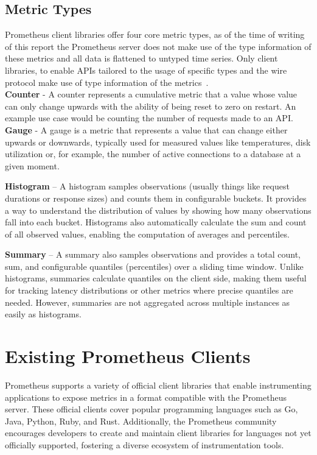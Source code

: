 \subsection{Metric Types}\label{subsec:metric-types}

Prometheus client libraries offer four core metric types, as of the time of writing of this report the Prometheus
server does not make use of the type information of these metrics and all data is flattened to untyped time series.
Only client libraries, to enable \ac{API}s tailored to the usage of specific types and the wire protocol make use of
type information of the metrics~\cite{prometheus_metric_types}.\\

\textbf{Counter} - A counter represents a cumulative metric that a value whose value can only change upwards with
the ability of being reset to zero on restart.
An example use case would be counting the number of requests made to an \ac{API}.\\

\textbf{Gauge} - A gauge is a metric that represents a value that can change either upwards or downwards, typically
used for measured values like temperatures, disk utilization or, for example, the number of active connections
to a database at a given moment.

\textbf{Histogram} – A histogram samples observations (usually things like request durations or response sizes) and counts them in configurable buckets.
It provides a way to understand the distribution of values by showing how many observations fall into each bucket.
Histograms also automatically calculate the sum and count of all observed values, enabling the computation of averages and percentiles.

\textbf{Summary} – A summary also samples observations and provides a total count, sum, and configurable quantiles (percentiles) over a sliding time window.
Unlike histograms, summaries calculate quantiles on the client side, making them useful for tracking latency distributions or other metrics where precise quantiles are needed.
However, summaries are not aggregated across multiple instances as easily as histograms.


\section{Existing Prometheus Clients}\label{sec:existing-prometheus-clients}

Prometheus supports a variety of official client libraries that enable instrumenting applications to expose
metrics in a format compatible with the Prometheus server.
These official clients cover popular programming languages such as Go, Java, Python, Ruby, and Rust.
Additionally, the Prometheus community encourages developers to create and maintain client libraries for languages not yet officially supported, fostering a diverse ecosystem of instrumentation tools.

